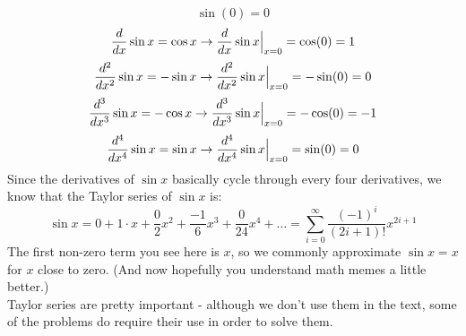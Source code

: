 \[
	\sin (0) = 0
\]
\[
	\frac{d }{d x} \sin x = \cos x \rightarrow \frac{d }{d x} \sin x \Big|_{x=0} = \cos (0) = 1
\]
\[
	\frac{d^2 }{d x^2} \sin x = -\sin x \rightarrow \frac{d^2 }{d x^2} \sin x \Big|_{x=0} = -\sin (0) = 0
\]
\[
	\frac{d^{3} }{d x^{3}} \sin x = -\cos x \rightarrow \frac{d^{3} }{d x^{3}} \sin x \Big|_{x=0} = -\cos (0) = -1
\]
\[
	\frac{d^{4} }{d x^{4}} \sin x =  \sin x \rightarrow \frac{d^{4} }{d x^{4}} \sin x \Big|_{x=0} =  \sin (0) = 0
\]
Since the derivatives of $\sin x$ basically cycle through every four derivatives, we know that the Taylor series of $\sin x$ is:
\[
	\sin x = 0 + 1 \cdot x + \frac{0}{2} x^2 + \frac{-1}{6}x^3 + \frac{0}{24}x^4 + \ldots = \sum_{i = 0}^{\infty} \frac{(-1)^i}{(2i+1)!}x^{2i+1}
\]
The first non-zero term you see here is $x$, so we commonly approximate $\sin x = x$ for $x$ close to zero. (And now hopefully you understand math memes a little better.) \\
Taylor series are pretty important - although we don't use them in the text, some of the problems do require their use in order to solve them. 
\pagebreak